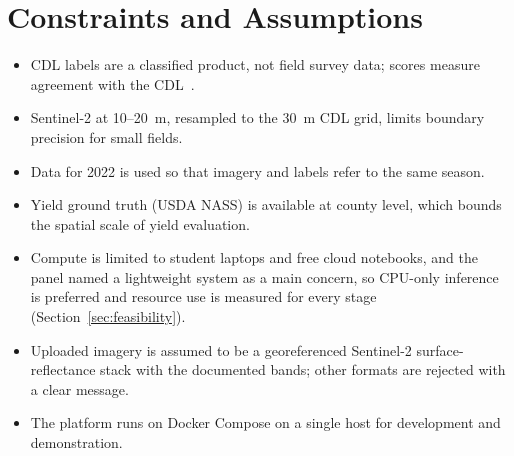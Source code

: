 \section{Constraints and Assumptions}
\begin{itemize}
  \item CDL labels are a classified product, not field survey data; scores measure agreement with
        the CDL~\cite{lin2022}.
  \item Sentinel-2 at 10--20~m, resampled to the 30~m CDL grid, limits boundary precision for small
        fields.
  \item Data for 2022 is used so that imagery and labels refer to the same season.
  \item Yield ground truth (USDA NASS) is available at county level, which bounds the spatial scale
        of yield evaluation.
  \item Compute is limited to student laptops and free cloud notebooks, and the panel named a
        lightweight system as a main concern, so CPU-only inference is preferred and resource use
        is measured for every stage (Section~\ref{sec:feasibility}).
  \item Uploaded imagery is assumed to be a georeferenced Sentinel-2 surface-reflectance stack with
        the documented bands; other formats are rejected with a clear message.
  \item The platform runs on Docker Compose on a single host for development and demonstration.
\end{itemize}

